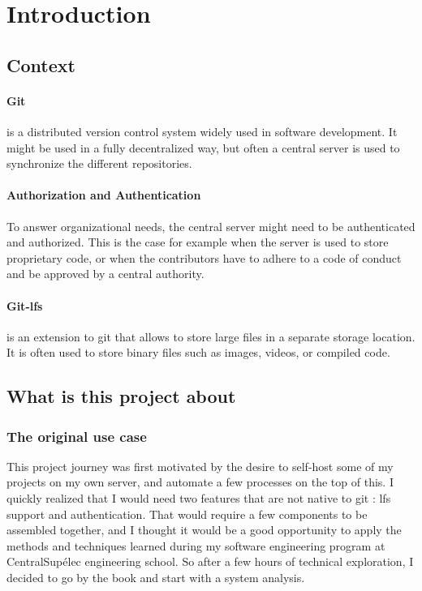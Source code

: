 \section{Introduction}

\subsection{Context}

\paragraph{Git} is a distributed version control system widely used in software development. It might be used in a fully decentralized way, but often a central server is used to synchronize the different repositories.

\paragraph{Authorization and Authentication} To answer organizational needs, the central server might need to be authenticated and authorized. This is the case for example when the server is used to store proprietary code, or when the contributors have to adhere to a code of conduct and be approved by a central authority.

\paragraph{Git-lfs} is an extension to git that allows to store large files in a separate storage location. It is often used to store binary files such as images, videos, or compiled code.

\subsection{What is this project about}

\subsubsection{The original use case}

This project journey was first motivated by the desire to self-host some of my projects on my own server, and automate a few processes on the top of this. I quickly realized that I would need two features that are not native to git : lfs support and authentication. That would require a few components to be assembled together, and I thought it would be a good opportunity to apply the methods and techniques learned during my software engineering program at CentralSupélec engineering school. So after a few hours of technical exploration, I decided to go by the book and start with a system analysis.

